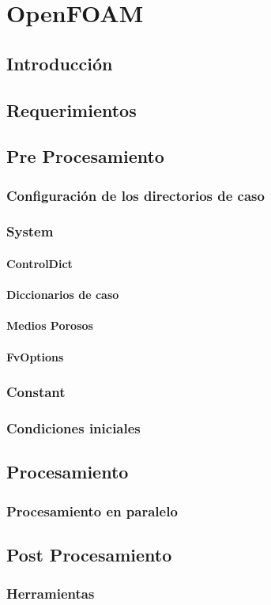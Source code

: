 \chapter{OpenFOAM}

\section{Introducción}

\section{Requerimientos}

\section{Pre Procesamiento}
	\subsection{Configuración de los directorios de caso}
	\subsection{System}
	\subsubsection{ControlDict}
	\subsubsection{Diccionarios de caso}
	\subsubsection{Medios Porosos}
	\subsubsection{FvOptions}
	\subsection{Constant}
	\subsection{Condiciones iniciales}
\section{Procesamiento}
	\subsection{Procesamiento en paralelo}
\section{Post Procesamiento}
	\subsection{Herramientas}